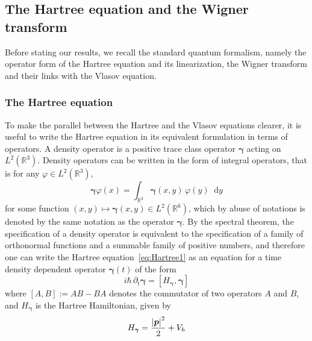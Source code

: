 \documentclass[a4paper,12pt]{amsart} %
\theoremstyle{plain}
\theoremstyle{definition}
\newcommand		{\RR}		{\mathbb R}			%
\newcommand		{\R}		{\RR}
\newcommand		{\Rd}		{\R^3}
\newcommand		{\Rdd}		{\R^6}
\newcommand		{\hd}		{h^3}
\newcommand		{\lt}			{\left}				%
\newcommand		{\rt}			{\right}			%
\renewcommand	{\(}			{\lt(}
\renewcommand	{\)}			{\rt)}
\newcommand		{\com}[1]		{\lt[{#1}\rt]}		%
\newcommand		{\n}[1]			{\lt\lvert{#1}\rt\rvert}	%
\renewcommand		{\d}		{\mathop{}\!\mathrm{d}}		%
\newcommand			{\dpt}		{\partial_t}
\DeclareMathOperator{\tr}		{Tr}				%
\newcommand		{\Tr}[1]		{\tr\!\( #1 \)}		%
\newcommand		{\intd}			{\int_{\Rd}}
\newcommand	{\h}			{h}
\newcommand		{\opgam}		{{\boldsymbol{\gamma}}}
\newcommand		{\op}			{\opgam}	%
\newcommand		{\opp}			{\boldsymbol{p}}
\begin{document}
\subsection{The Hartree equation and the Wigner transform} %


	Before stating our results, we recall the standard quantum formalism, namely the operator form of the Hartree equation and its linearization, the Wigner transform and their links with the Vlasov equation.

\subsubsection{The Hartree equation}

	To make the parallel between the Hartree and the Vlasov equations clearer, it is useful to write the Hartree equation in its equivalent formulation in terms of operators. A density operator is a positive trace class operator $\op$ acting on $L^2(\Rd)$.
	Density operators can be written in the form of integral operators, that is for any $\varphi \in L^2(\Rd)$,
	\vspace{-1pt}\begin{equation*}
		\op\varphi(x) = \intd \op(x,y)\,\varphi(y)\d y
	\end{equation*}
	for some function $(x,y)\mapsto\op(x,y) \in L^2(\Rdd)$, which by abuse of notations is denoted by the same notation as the operator $\op$. By the spectral theorem, the specification of a density operator is equivalent to the specification of a family of orthonormal functions and a summable family of positive numbers, and therefore one can write the Hartree equation~\eqref{eq:Hartree1} as an equation for a time density dependent operator $\op(t)$ of the form
	\begin{equation}\label{eq:Hartree}
		i\hbar\,\dpt\op = \com{H_{\op}, \op}
	\end{equation}
	where $\com{A,B} := AB-BA$ denotes the commutator of two operators $A$ and $B$, and $H_{\op}$ is the Hartree Hamiltonian, given by 
	\vspace{-1pt}\begin{equation*}\vspace{-1pt}
		H_{\op} = \frac{\n{\opp}^2}{2} + V_\h
	\end{equation*} 
\end{document}
